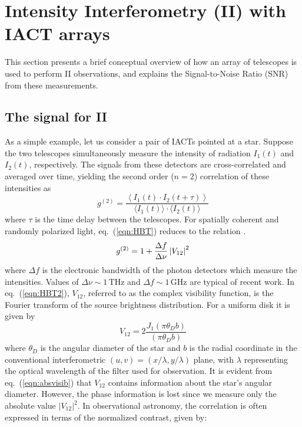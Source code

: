 \section{Intensity Interferometry (II) with IACT arrays}

This section presents a brief conceptual overview of how an array of telescopes is used to perform II observations, and explains the Signal-to-Noise Ratio (SNR) from these measurements.

\subsection{The signal for II}\label{sec:signal}
As a simple example, let us consider a pair of IACTs pointed at a star. Suppose the two telescopes simultaneously measure the intensity of radiation $I_1(t)$ and $I_2(t)$, respectively. The signals from these detectors are cross-correlated and averaged over time, yielding the second order ($n=2$) correlation of these intensities as \citep[cf.][]{acciari2020optical, 2013APh....43..331D}
\begin{equation}
	g^{(2)}= \frac{\left\langle I_1(t) \cdot I_2(t + \tau) \right\rangle}{\langle I_1(t) \rangle \cdot \langle I_2(t) \rangle} 
	\label{eqn:HBT}
\end{equation}
where $\tau$ is the time delay between the telescopes. For spatially coherent and randomly polarized light, eq.~(\ref{eqn:HBT}) reduces to the relation \citep[sometimes called the Siegert relation, see e.g.,][]{acciari2020optical}.
\begin{equation}
	g^{(2)} = 1 + \frac{\Delta f}{\Delta \nu} \left|V_{12}\right|^2
	\label{eqn:HBT2}
\end{equation}
where $\Delta f$ is the electronic bandwidth of the photon detectors which measure the intensities.  Values of $\Delta\nu\sim 1\,\mathrm{THz}$ and $\Delta f \sim 1\,\mathrm{GHz}$ are typical of recent work.  In eq.~(\ref{eqn:HBT2}), $V_{12}$, referred to as the complex visibility function, is the Fourier transform of the source brightness distribution. For a uniform disk it is given by
\begin{equation}
 V_{12} = 2 \frac{J_1(\pi\theta_D b)}{(\pi\theta_D b)}
\label{eqn:absvisib}
\end{equation}
where $\theta_D$ is the angular diameter of the star and $b$ is the radial coordinate in the conventional interferometric $(u , v) = (x/\lambda, y/\lambda)$ plane, with $\lambda$ representing the optical wavelength of the filter used for observation. It is evident from eq.~(\ref{eqn:absvisib}) that $V_{12}$ contains information about the star's angular diameter. However, the phase information is lost since we measure only the absolute value $\vert V_{12} \vert^2$. In observational astronomy, the correlation is often expressed in terms of the normalized contrast, given by:
